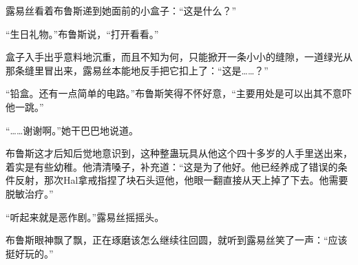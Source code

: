 露易丝看着布鲁斯递到她面前的小盒子：“这是什么？”

“生日礼物。”布鲁斯说，“打开看看。”

盒子入手出乎意料地沉重，而且不知为何，只能掀开一条小小的缝隙，一道绿光从那条缝里冒出来，露易丝本能地反手把它扣上了：“这是……？”

“铅盒。还有一点简单的电路。”布鲁斯笑得不怀好意，“主要用处是可以出其不意吓他一跳。”

“……谢谢啊。”她干巴巴地说道。

布鲁斯这才后知后觉地意识到，这种整蛊玩具从他这个四十多岁的人手里送出来，着实是有些幼稚。他清清嗓子，补充道：“这是为了他好。他已经养成了错误的条件反射，那次Hal拿戒指捏了块石头逗他，他眼一翻直接从天上掉了下去。他需要脱敏治疗。”

“听起来就是恶作剧。”露易丝摇摇头。

布鲁斯眼神飘了飘，正在琢磨该怎么继续往回圆，就听到露易丝笑了一声：“应该挺好玩的。”